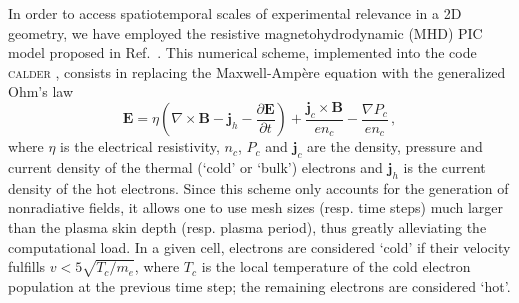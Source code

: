 \documentclass[aps,showpacs,superscriptaddress]{revtex4}
\begin{document}
In order to access spatiotemporal scales of experimental relevance in a 2D geometry, we have employed the resistive magnetohydrodynamic (MHD) PIC model proposed in Ref.~\cite{JCP_Cohen_2010}. This numerical scheme, implemented into the code \textsc{calder} \cite{NF_Lefebvre_2003}, consists in replacing the Maxwell-Amp\`ere equation with the generalized Ohm's law
\begin{equation} \label{eq:PICMHD}
  \mathbf{E}=\eta \left(\nabla \times \mathbf{B}-\mathbf{j}_h-\frac{\partial \mathbf{E}}{\partial t}\right)+\frac{\mathbf{j}_c\times \mathbf{B}}{en_c}
  -\frac{\nabla P_c}{en_c} \,,
\end{equation}
where $\eta$ is the electrical resistivity, $n_c$, $P_c$ and $\mathbf{j}_c$ are the density, pressure and current density of the thermal (`cold' or `bulk') electrons and $\mathbf{j}_h$ is the current density of the hot electrons. Since this scheme only accounts for the generation of nonradiative fields, it allows one to use mesh sizes (resp. time steps) much larger than the plasma skin depth (resp. plasma period), thus greatly alleviating the computational load. In a given cell, electrons are considered `cold' if their velocity fulfills $v<5\sqrt{T_c/m_e}$, where $T_c$ is the local temperature of the cold electron population at the previous time step; the remaining electrons are considered `hot'.
\end{document}
